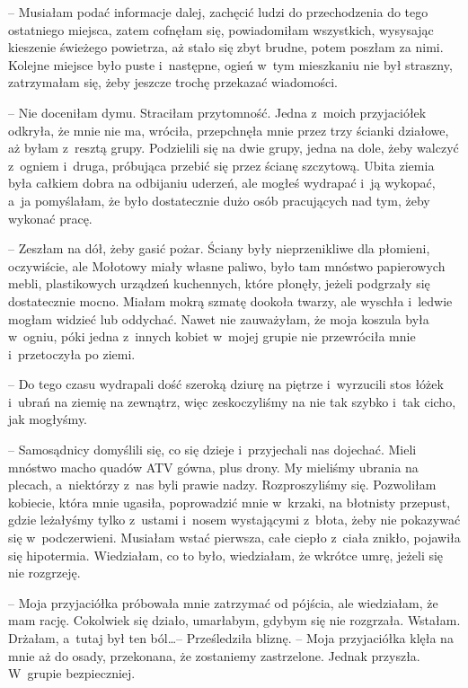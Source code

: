 \documentclass[oneside,polish,11pt,sfheadings]{mwbk}
\begin{document}
-- Musiałam podać informacje dalej, zachęcić ludzi do przechodzenia do
tego ostatniego miejsca, zatem cofnęłam się, powiadomiłam wszystkich,
wysysając kieszenie świeżego powietrza, aż stało się zbyt brudne, potem
poszłam za nimi. Kolejne miejsce było puste i~następne, ogień w~tym
mieszkaniu nie był straszny, zatrzymałam się, żeby jeszcze trochę
przekazać wiadomości.

-- Nie doceniłam dymu. Straciłam przytomność. Jedna z~moich przyjaciółek
odkryła, że mnie nie ma, wróciła, przepchnęła mnie przez trzy ścianki
działowe, aż byłam z~resztą grupy. Podzielili się na dwie grupy, jedna
na dole, żeby walczyć z~ogniem i~druga, próbująca przebić się przez
ścianę szczytową. Ubita ziemia była całkiem dobra na odbijaniu uderzeń,
ale mogłeś wydrapać i~ją wykopać, a~ja pomyślałam, że było dostatecznie
dużo osób pracujących nad tym, żeby wykonać pracę.

-- Zeszłam na dół, żeby gasić pożar. Ściany były nieprzenikliwe dla
płomieni, oczywiście, ale Mołotowy miały własne paliwo, było tam mnóstwo
papierowych mebli, plastikowych urządzeń kuchennych, które płonęły,
jeżeli podgrzały się dostatecznie mocno. Miałam mokrą szmatę dookoła
twarzy, ale wyschła i~ledwie mogłam widzieć lub oddychać. Nawet nie
zauważyłam, że moja koszula była w~ogniu, póki jedna z~innych kobiet w~mojej grupie nie przewróciła mnie i~przetoczyła po ziemi.

-- Do tego czasu wydrapali dość szeroką dziurę na piętrze i~wyrzucili
stos łóżek i~ubrań na ziemię na zewnątrz, więc zeskoczyliśmy na nie tak
szybko i~tak cicho, jak mogłyśmy.

-- Samosądnicy domyślili się, co się dzieje i~przyjechali nas dojechać.
Mieli mnóstwo macho quadów ATV gówna, plus drony. My mieliśmy ubrania na
plecach, a~niektórzy z~nas byli prawie nadzy. Rozproszyliśmy się.
Pozwoliłam kobiecie, która mnie ugasiła, poprowadzić mnie w~krzaki, na
błotnisty przepust, gdzie leżałyśmy tylko z~ustami i~nosem wystającymi z~błota, żeby nie pokazywać się w~podczerwieni. Musiałam wstać pierwsza,
całe ciepło z~ciała znikło, pojawiła się hipotermia. Wiedziałam, co to
było, wiedziałam, że wkrótce umrę, jeżeli się nie rozgrzeję.

-- Moja przyjaciółka próbowała mnie zatrzymać od pójścia, ale wiedziałam,
że mam rację. Cokolwiek się działo, umarłabym, gdybym się nie rozgrzała.
Wstałam. Drżałam, a~tutaj był ten ból\ldots  -- Prześledziła bliznę. -- Moja
przyjaciółka klęła na mnie aż do osady, przekonana, że zostaniemy
zastrzelone. Jednak przyszła. W~grupie bezpieczniej.
\end{document}
